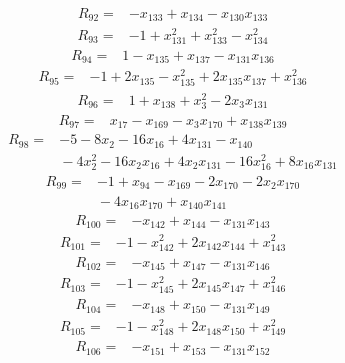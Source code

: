 \documentclass[11pt]{article}
\theoremstyle{definition}
\theoremstyle{remark}
\begin{document}
\begin{align*}
R_{92} ={}& -x_{133} + x_{134} - x_{130} x_{133}
\end{align*}
\begin{align*}
R_{93} ={}& -1 + x_{131}^{2} + x_{133}^{2} - x_{134}^{2}
\end{align*}
\begin{align*}
R_{94} ={}& 1 - x_{135} + x_{137} - x_{131} x_{136}
\end{align*}
\begin{align*}
R_{95} ={}& -1 + 2x_{135} - x_{135}^{2} + 2x_{135} x_{137} + x_{136}^{2}
\end{align*}
\begin{align*}
R_{96} ={}& 1 + x_{138} + x_{3}^{2} - 2x_{3} x_{131}
\end{align*}
\begin{align*}
R_{97} ={}& x_{17} - x_{169} - x_{3} x_{170} + x_{138} x_{139}
\end{align*}
\begin{align*}
R_{98} ={}& -5 - 8x_{2} - 16x_{16} + 4x_{131} - x_{140} \\
&{} -4x_{2}^{2} - 16x_{2} x_{16} + 4x_{2} x_{131} - 16x_{16}^{2} + 8x_{16} x_{131}
\end{align*}
\begin{align*}
R_{99} ={}& -1 + x_{94} - x_{169} - 2x_{170} - 2x_{2} x_{170} \\
&{} -4x_{16} x_{170} + x_{140} x_{141}
\end{align*}
\begin{align*}
R_{100} ={}& -x_{142} + x_{144} - x_{131} x_{143}
\end{align*}
\begin{align*}
R_{101} ={}& -1 - x_{142}^{2} + 2x_{142} x_{144} + x_{143}^{2}
\end{align*}
\begin{align*}
R_{102} ={}& -x_{145} + x_{147} - x_{131} x_{146}
\end{align*}
\begin{align*}
R_{103} ={}& -1 - x_{145}^{2} + 2x_{145} x_{147} + x_{146}^{2}
\end{align*}
\begin{align*}
R_{104} ={}& -x_{148} + x_{150} - x_{131} x_{149}
\end{align*}
\begin{align*}
R_{105} ={}& -1 - x_{148}^{2} + 2x_{148} x_{150} + x_{149}^{2}
\end{align*}
\begin{align*}
R_{106} ={}& -x_{151} + x_{153} - x_{131} x_{152}
\end{align*}
\end{document}

